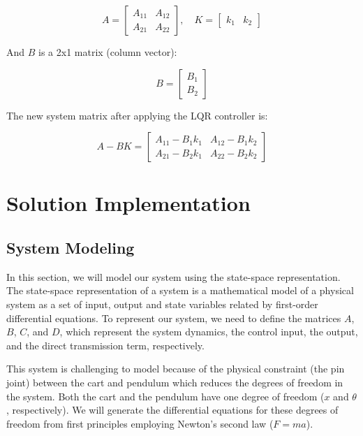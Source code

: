 \documentclass[11pt,twocolumn,twoside,lineno]{pnas-new}
\begin{document}
\begin{equation}
A = \begin{bmatrix} A_{11} & A_{12} \\ A_{21} & A_{22} \end{bmatrix}, \quad K = \begin{bmatrix} k_{1} & k_{2} \end{bmatrix}
\end{equation}

And \(B\) is a 2x1 matrix (column vector):

\begin{equation}
B = \begin{bmatrix} B_{1} \\ B_{2} \end{bmatrix}
\end{equation}

The new system matrix after applying the LQR controller is:

\begin{equation}
A - BK = \begin{bmatrix} A_{11} - B_{1}k_{1} & A_{12} - B_{1}k_{2} \\ A_{21} - B_{2}k_{1} & A_{22} - B_{2}k_{2} \end{bmatrix}
\end{equation}


\section{Solution Implementation}
\subsection{System Modeling}
In this section, we will model our system using the state-space representation. The state-space representation of a system is a mathematical model of a physical system as a set of input, output and state variables related by first-order differential equations. To represent our system, we need to define the matrices \(A\), \(B\), \(C\), and \(D\), which represent the system dynamics, the control input, the output, and the direct transmission term, respectively. 

This system is challenging to model because of the physical constraint (the pin joint) between the cart and pendulum which reduces the degrees of freedom in the system. Both the cart and the pendulum have one degree of freedom (\(x\) and \(\theta\), respectively). We will generate the differential equations for these degrees of freedom from first principles employing Newton's second law (\(F = ma\)).
\end{document}
